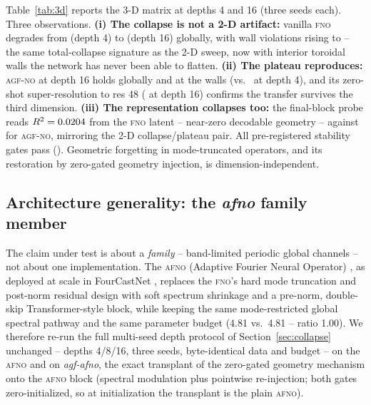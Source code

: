 \documentclass[11pt]{article}
\theoremstyle{definition}
\newcommand{\fno}{\textsc{fno}}
\newcommand{\agfno}{\textsc{agf-no}}
\newcommand{\afno}{\textsc{afno}}
\newcommand{\AfnoParams}{4.81}
\newcommand{\AfnoParamsRatio}{1.00}
\newcommand{\FnoParams}{4.81}
\newcommand{\Rtwo}{R^2}
\begin{document}
Table~\ref{tab:3d} reports the 3-D matrix at depths 4 and 16 (three seeds
each). Three observations. \textbf{(i) The collapse is not a 2-D artifact:}
vanilla \fno{} degrades from \ThreeDDFourFnoRelL{} (depth 4) to
\ThreeDDSixteenFnoRelL{} (depth 16) globally, with wall violations rising to
\ThreeDDSixteenFnoWall{} -- the same total-collapse signature as the 2-D
sweep, now with interior toroidal walls the network has never been able to
flatten. \textbf{(ii) The plateau reproduces:} \agfno{} at depth 16 holds
\ThreeDDSixteenAgfnoRelL{} globally and \ThreeDDSixteenAgfnoRing{} at the
walls (vs.\ \ThreeDDFourAgfnoRing{} at depth 4), and its zero-shot
super-resolution to res 48 (\ThreeDDSixteenAgfnoSR{} at depth 16) confirms
the transfer survives the third dimension. \textbf{(iii) The representation
collapses too:} the final-block probe reads $\Rtwo =
\ThreeDDSixteenFnoProbe$ from the \fno{} latent -- near-zero decodable
geometry -- against \ThreeDDSixteenAgfnoProbe{} for \agfno{}, mirroring the
2-D collapse/plateau pair. All pre-registered stability gates pass
(\ThreeDGatesPass{}). Geometric forgetting in mode-truncated operators, and
its restoration by zero-gated geometry injection, is dimension-independent.

\ifdefined\AfnoCollapseRatio
\subsection{Architecture generality: the \emph{afno} family member}
\label{sec:afno}

The claim under test is about a \emph{family} -- band-limited periodic
global channels -- not about one implementation. The \afno{} (Adaptive
Fourier Neural Operator) \citep{guibas2022afno}, as deployed at scale in
FourCastNet \citep{pathak2022fourcastnet}, replaces the \fno{}'s hard mode
truncation and post-norm residual design with soft spectrum shrinkage and a
pre-norm, double-skip Transformer-style block, while keeping the same
mode-restricted global spectral pathway and the same parameter budget
(\AfnoParams{} vs.\ \FnoParams{} -- ratio \AfnoParamsRatio). We therefore
re-run the full multi-seed depth protocol of Section~\ref{sec:collapse}
unchanged -- depths 4/8/16, three seeds, byte-identical data and budget --
on the \afno{} and on \emph{agf-afno}, the exact transplant of the
zero-gated geometry mechanism onto the \afno{} block (spectral modulation
plus pointwise re-injection; both gates zero-initialized, so at
initialization the transplant is the plain \afno{}).
\end{document}
